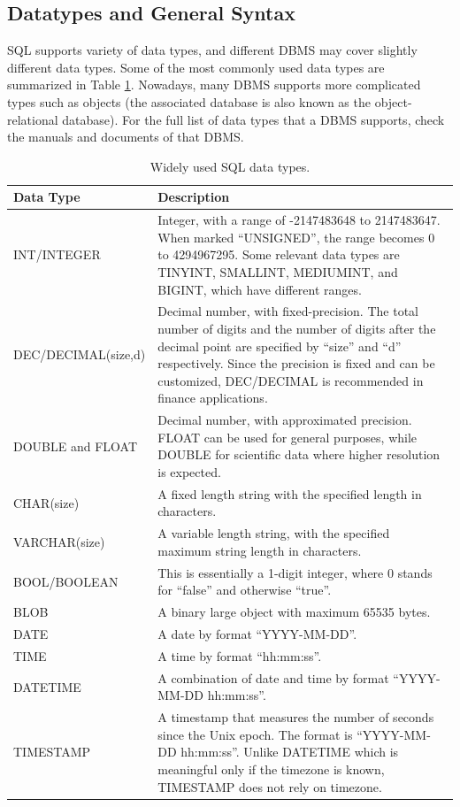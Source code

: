 \subsection{Datatypes and General Syntax}

SQL supports variety of data types, and different DBMS may cover slightly different data types. Some of the most commonly used data types are summarized in Table \ref{ch:db:tab:sqldatatypes}. Nowadays, many DBMS supports more complicated types such as objects (the associated database is also known as the object-relational database). For the full list of data types that a DBMS supports, check the manuals and documents of that DBMS.

\begin{table}[!htb]
	\centering \caption{Widely used SQL data types.}\label{ch:db:tab:sqldatatypes}
	\begin{tabularx}{\textwidth}{lX}
		\hline
		Data Type & Description \\ \hline
		INT/INTEGER & Integer, with a range of -2147483648 to 2147483647. When marked ``UNSIGNED'', the range becomes 0 to 4294967295. Some relevant data types are TINYINT, SMALLINT, MEDIUMINT, and BIGINT, which have different ranges. \\ 
		DEC/DECIMAL(size,d) & Decimal number, with fixed-precision. The total number of digits and the number of digits after the decimal point are specified by ``size'' and ``d'' respectively. Since the precision is fixed and can be customized, DEC/DECIMAL is recommended in finance applications. \\ 
		DOUBLE and FLOAT & Decimal number, with approximated precision. FLOAT can be used for general purposes, while DOUBLE for scientific data where higher resolution is expected. \\
		CHAR(size) & A fixed length string with the specified length in characters. \\ 
		VARCHAR(size) & A variable length string, with the specified maximum string length in characters. \\ 
		BOOL/BOOLEAN & This is essentially a 1-digit integer, where 0 stands for ``false'' and otherwise ``true''. \\ 
		BLOB & A binary large object with maximum 65535 bytes. \\ 
		DATE & A date by format ``YYYY-MM-DD''. \\ 
		TIME & A time by format ``hh:mm:ss''. \\ 
		DATETIME & A combination of date and time by format ``YYYY-MM-DD hh:mm:ss''. \\ 
		TIMESTAMP & A timestamp that measures the number of seconds since the Unix epoch. The format is ``YYYY-MM-DD hh:mm:ss''. Unlike DATETIME which is meaningful only if the timezone is known, TIMESTAMP does not rely on timezone. \\ \hline
	\end{tabularx}
\end{table}

